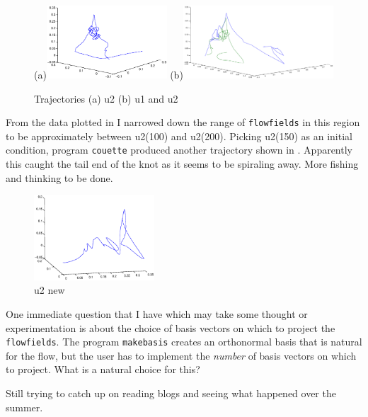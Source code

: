 \documentclass[pre,onecolumn,groupedaddress]{revtex4}
\begin{document}
\begin{figure}[!h]
(a)\includegraphics[width=0.40\textwidth]{plot4.eps}
(b)\includegraphics[width=0.50\textwidth]{u1u2.eps}
  \caption{Trajectories
  (a) {u2} (b) {u1 and u2} }
  \label{u2}
 \end{figure}

From the data plotted in  I narrowed down the range of
 {\tt flowfields} in this region to be approximately between u2(100) and
 u2(200). Picking u2(150) as an initial condition, program {\tt couette}
 produced another trajectory shown in . Apparently this
 caught the tail end of the knot as it seems to be spiraling away.
 More fishing and thinking to be done.
\begin{figure}[!h]
\includegraphics[width=0.40\textwidth]{u2_1.eps}
\caption{u2 new}
  \label{u2_1}
 \end{figure}


 One immediate question that I have which may take some thought or experimentation is about the choice of basis vectors on
 which to project the {\tt flowfields}. The program {\tt makebasis}
 creates an orthonormal basis that is natural for the flow, but the
 user has to implement the \emph{number} of basis vectors on which to
 project. What is a natural choice for this?

 Still trying to catch up on reading blogs and seeing what happened over the
 summer.







\end{document}

